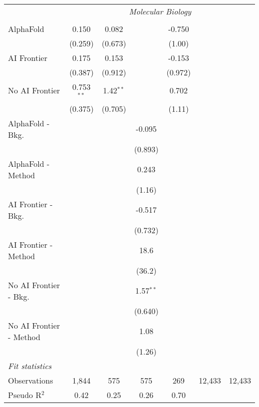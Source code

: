 \begin{tabular}{lcccccc}
 & \multicolumn{6}{c}{\textit{Molecular Biology}} \\ \\
   AlphaFold               & 0.150        & 0.082       &             & -0.750  &        &   \\   
                           & (0.259)      & (0.673)     &             & (1.00)  &        &   \\   
   AI Frontier             & 0.175        & 0.153       &             & -0.153  &        &   \\   
                           & (0.387)      & (0.912)     &             & (0.972) &        &   \\   
   No AI Frontier          & 0.753$^{**}$ & 1.42$^{**}$ &             & 0.702   &        &   \\   
                           & (0.375)      & (0.705)     &             & (1.11)  &        &   \\   
   AlphaFold - Bkg.        &              &             & -0.095      &         &        &   \\   
                           &              &             & (0.893)     &         &        &   \\   
   AlphaFold - Method      &              &             & 0.243       &         &        &   \\   
                           &              &             & (1.16)      &         &        &   \\   
   AI Frontier - Bkg.      &              &             & -0.517      &         &        &   \\   
                           &              &             & (0.732)     &         &        &   \\   
   AI Frontier - Method    &              &             & 18.6        &         &        &   \\   
                           &              &             & (36.2)      &         &        &   \\   
   No AI Frontier - Bkg.   &              &             & 1.57$^{**}$ &         &        &   \\   
                           &              &             & (0.640)     &         &        &   \\   
   No AI Frontier - Method &              &             & 1.08        &         &        &   \\   
                           &              &             & (1.26)      &         &        &   \\   
   \midrule
   \emph{Fit statistics}\\
   Observations            & 1,844        & 575         & 575         & 269     & 12,433 & 12,433\\  
   Pseudo R$^2$            & 0.42         & 0.25        & 0.26        & 0.70    &        & \\  
   

\end{tabular}
